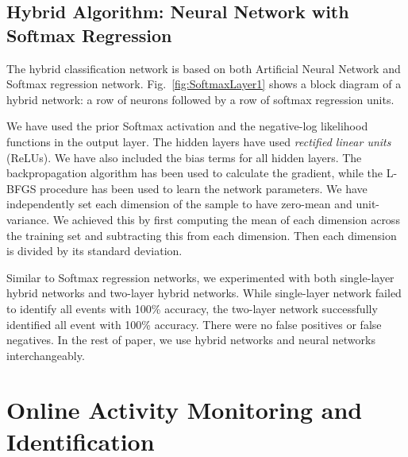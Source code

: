 \documentclass[]{IEEEtran}
\begin{document}

\subsection{Hybrid Algorithm: Neural Network with Softmax Regression}
\label{sec:HybridAlgorithmNeuralNetworkAndSoftmaxRegreation}

The hybrid classification network is based on both Artificial Neural Network  and Softmax regression network. Fig.~\ref{fig:SoftmaxLayer1} shows a block diagram of a hybrid network: a row of neurons followed by a row of softmax regression units.
\par
We have used the prior Softmax activation  and the negative-log likelihood 
functions in the output layer. The hidden layers have used \emph{rectified linear units }(ReLUs). 
We have also included the bias terms for all hidden layers. The backpropagation algorithm\cite{Sarkar1995}
has been used to calculate the gradient, while the L-BFGS procedure has been used to 
learn the network parameters. We have independently set each dimension of the sample to 
have zero-mean and unit-variance. We achieved this by first computing the mean of each 
dimension across the training set and subtracting this from each dimension. Then each 
dimension is divided by its standard deviation.       

Similar to Softmax regression networks, we experimented  with both single-layer hybrid networks and two-layer hybrid networks. While single-layer network failed to identify all events with 100\% accuracy, the two-layer network successfully identified all event with 100\% accuracy. There were no false positives or false negatives. In the rest of paper, we use hybrid networks and neural networks interchangeably.

\section{Online Activity Monitoring and Identification}
\end{document}
